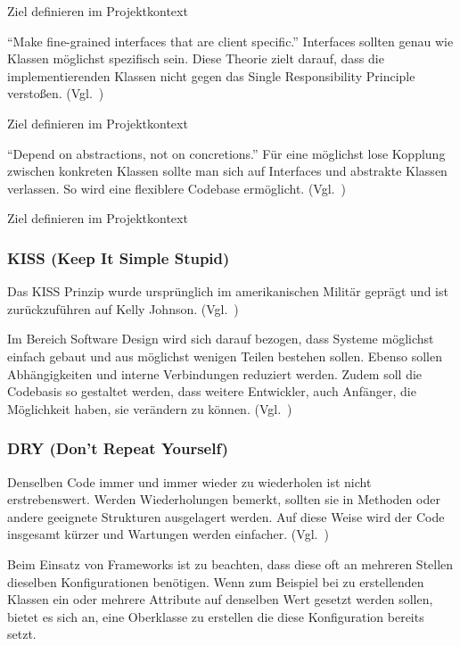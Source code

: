 \color{red}
Ziel definieren im Projektkontext
\color{black}

\enquote{Make fine-grained interfaces that are client specific.}\cite{solid}
Interfaces sollten genau wie Klassen möglichst spezifisch sein.
Diese Theorie zielt darauf, dass die implementierenden Klassen nicht gegen das Single Responsibility Principle verstoßen.
(Vgl.~\cite{design-patterns-php-laravel})

\color{red}
Ziel definieren im Projektkontext
\color{black}

\enquote{Depend on abstractions, not on concretions.}\cite{solid}
Für eine möglichst lose Kopplung zwischen konkreten Klassen sollte man sich auf Interfaces und abstrakte Klassen verlassen.
So wird eine flexiblere Codebase ermöglicht.
(Vgl.~\cite{design-patterns-php-laravel})

\color{red}
Ziel definieren im Projektkontext
\color{black}

\newpage

\subsubsection{KISS (Keep It Simple Stupid)}
Das KISS Prinzip wurde ursprünglich im amerikanischen Militär geprägt und ist zurückzuführen auf Kelly Johnson.
(Vgl.~\cite{kelly-johnson-memoir})

Im Bereich Software Design wird sich darauf bezogen, dass Systeme möglichst einfach gebaut und aus möglichst wenigen Teilen bestehen sollen.
Ebenso sollen Abhängigkeiten und interne Verbindungen reduziert werden.
Zudem soll die Codebasis so gestaltet werden, dass weitere Entwickler, auch Anfänger, die Möglichkeit haben, sie verändern zu können.
(Vgl.~\cite{kiss-principle-explained})

\subsubsection{DRY (Don’t Repeat Yourself)}
Denselben Code immer und immer wieder zu wiederholen ist nicht erstrebenswert.
Werden Wiederholungen bemerkt, sollten sie in Methoden oder andere geeignete Strukturen ausgelagert werden.
Auf diese Weise wird der Code insgesamt kürzer und Wartungen werden einfacher.
(Vgl.~\cite{the-pragmatic-programmer})

Beim Einsatz von Frameworks ist zu beachten, dass diese oft an mehreren Stellen dieselben Konfigurationen benötigen.
Wenn zum Beispiel bei zu erstellenden Klassen ein oder mehrere Attribute auf denselben Wert gesetzt werden sollen, bietet es sich an, eine Oberklasse zu erstellen die diese Konfiguration bereits setzt.

